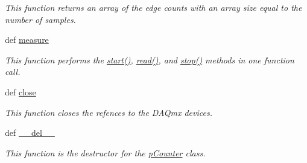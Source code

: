 \begin{DoxyCompactItemize}
\begin{DoxyCompactList}\small\item\em This function returns an array of the edge counts with an array size equal to the number of samples. \end{DoxyCompactList}\item 
def \hyperlink{class_chassis_8git_1_1p_counter_1_1p_counter_ab857f95f27c53280488d54999ffee4c6}{measure}
\begin{DoxyCompactList}\small\item\em This function performs the \hyperlink{class_chassis_8git_1_1p_counter_1_1p_counter_a70605632a820fcbded267beb432fcdb4}{start()}, \hyperlink{class_chassis_8git_1_1p_counter_1_1p_counter_aa462351619f5172f6ac669b4a1ba84d3}{read()}, and \hyperlink{class_chassis_8git_1_1p_counter_1_1p_counter_ab8bfeabc13832e4b7d409bfbf7c20d90}{stop()} methods in one function call. \end{DoxyCompactList}\item 
def \hyperlink{class_chassis_8git_1_1p_counter_1_1p_counter_a94f72092f1d0f0cec7b16e5c857f9246}{close}
\begin{DoxyCompactList}\small\item\em This function closes the refences to the D\-A\-Qmx devices. \end{DoxyCompactList}\item 
def \hyperlink{class_chassis_8git_1_1p_counter_1_1p_counter_af2cfe16174ae7c08fcbe673fdff92e41}{\-\_\-\-\_\-del\-\_\-\-\_\-}
\begin{DoxyCompactList}\small\item\em This function is the destructor for the \hyperlink{class_chassis_8git_1_1p_counter_1_1p_counter}{p\-Counter} class. \end{DoxyCompactList}\end{DoxyCompactItemize}

